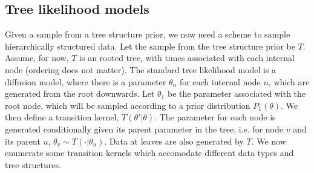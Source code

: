 \documentclass{article}
\begin{document}
\subsection{Tree likelihood models}

Given a sample from a tree structure prior, 
we now need a scheme to sample
hierarchically structured data.
Let the sample from the tree
structure prior be $T$.
Assume, for now, $T$ is
an rooted tree,
with times associated with each internal node (ordering does not matter).
The standard tree likelihood model is a diffusion model,
where there is a parameter $\theta_n$ for each internal
node $n$, which are generated from the root downwards.
Let $\theta_1$ be the parameter associated with the root node,
which will be sampled according to a prior distribution $P_1(\theta)$.
We then define a transition kernel, $T(\theta' | \theta)$.
The parameter for each node is generated conditionally
given its parent parameter in the tree,
i.e. for node $v$ and its parent $u$,
$\theta_v \sim T(\cdot | \theta_u)$.
Data at leaves are also generated by $T$.
We now enumerate some transition kernels
which accomodate different data types and tree structures.
\end{document}
